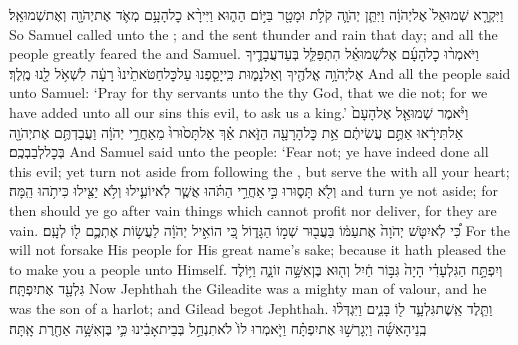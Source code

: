 {וַיִּקְרָ֤א שְׁמוּאֵל֙ אֶל\maqqaf יְהֹוָ֔ה וַיִּתֵּ֧ן יְהֹוָ֛ה קֹלֹ֥ת וּמָטָ֖ר בַּיּ֣וֹם הַה֑וּא וַיִּירָ֨א כׇל\maqqaf הָעָ֥ם מְאֹ֛ד אֶת\maqqaf יְהֹוָ֖ה וְאֶת\maqqaf שְׁמוּאֵֽל׃}
{So Samuel called unto the \lord; and the \lord\space sent thunder and rain that day; and all the people greatly feared the \lord\space and Samuel.}
{וַיֹּאמְר֨וּ כׇל\maqqaf הָעָ֜ם אֶל\maqqaf שְׁמוּאֵ֗ל הִתְפַּלֵּ֧ל בְּעַד\maqqaf עֲבָדֶ֛יךָ אֶל\maqqaf יְהֹוָ֥ה אֱלֹהֶ֖יךָ וְאַל\maqqaf נָמ֑וּת כִּֽי\maqqaf יָסַ֤פְנוּ עַל\maqqaf כׇּל\maqqaf חַטֹּאתֵ֙ינוּ֙ רָעָ֔ה לִשְׁאֹ֥ל לָ֖נוּ מֶֽלֶךְ׃}
{And all the people said unto Samuel: ‘Pray for thy servants unto the \lord\space thy God, that we die not; for we have added unto all our sins this evil, to ask us a king.’}
{וַיֹּ֨אמֶר שְׁמוּאֵ֤ל אֶל\maqqaf הָעָם֙ אַל\maqqaf תִּירָ֔אוּ אַתֶּ֣ם עֲשִׂיתֶ֔ם אֵ֥ת כׇּל\maqqaf הָרָעָ֖ה הַזֹּ֑את אַ֗ךְ אַל\maqqaf תָּס֙וּרוּ֙ מֵאַחֲרֵ֣י יְהֹוָ֔ה וַעֲבַדְתֶּ֥ם אֶת\maqqaf יְהֹוָ֖ה בְּכׇל\maqqaf לְבַבְכֶֽם׃}
{And Samuel said unto the people: ‘Fear not; ye have indeed done all this evil; yet turn not aside from following the \lord, but serve the \lord\space with all your heart;}
{וְלֹ֖א תָּס֑וּרוּ כִּ֣י \legarmeh  אַחֲרֵ֣י הַתֹּ֗הוּ אֲשֶׁ֧ר לֹֽא\maqqaf יוֹעִ֛ילוּ וְלֹ֥א יַצִּ֖ילוּ כִּי\maqqaf תֹ֥הוּ הֵֽמָּה׃}
{and turn ye not aside; for then should ye go after vain things which cannot profit nor deliver, for they are vain.}
{כִּ֠י לֹֽא\maqqaf יִטֹּ֤שׁ יְהֹוָה֙ אֶת\maqqaf עַמּ֔וֹ בַּעֲב֖וּר שְׁמ֣וֹ הַגָּד֑וֹל כִּ֚י הוֹאִ֣יל יְהֹוָ֔ה לַעֲשׂ֥וֹת אֶתְכֶ֛ם ל֖וֹ לְעָֽם׃}
{For the \lord\space will not forsake His people for His great name’s sake; because it hath pleased the \lord\space to make you a people unto Himself.}
\newperek
{}
\label{haft_39}
\setcounter{chap}{11}
\setcounter{verse}{1}
{וְיִפְתָּ֣ח הַגִּלְעָדִ֗י הָיָה֙ גִּבּ֣וֹר חַ֔יִל וְה֖וּא בֶּן\maqqaf אִשָּׁ֣ה זוֹנָ֑ה וַיּ֥וֹלֶד גִּלְעָ֖ד אֶת\maqqaf יִפְתָּֽח׃}
{Now Jephthah the Gileadite was a mighty man of valour, and he was the son of a harlot; and Gilead begot Jephthah.}
{וַתֵּ֧לֶד אֵֽשֶׁת\maqqaf גִּלְעָ֛ד ל֖וֹ בָּנִ֑ים וַיִּגְדְּל֨וּ בְֽנֵי\maqqaf הָאִשָּׁ֜ה וַיְגָרְשׁ֣וּ אֶת\maqqaf יִפְתָּ֗ח וַיֹּ֤אמְרוּ לוֹ֙ לֹא\maqqaf תִנְחַ֣ל בְּבֵית\maqqaf אָבִ֔ינוּ כִּ֛י בֶּן\maqqaf אִשָּׁ֥ה אַחֶ֖רֶת אָֽתָּה׃}
